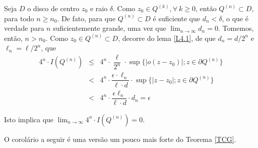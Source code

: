 {Seja $D$ o disco de centro $z_0$ e raio $\delta$. Como $z_0 \in Q^{(k)}, \forall\ k \ge 0$, então $Q^{(n)} \subset D$, para todo $n \ge n_0$. De fato, para que $Q^{(n)} \subset D$ é suficiente que $d_n < \delta$, o que é verdade para $n$ suficientemente grande, uma vez que $\displaystyle\lim_{n \to \infty} d_n = 0$. Tomemos, então, $n > n_0$. Como $z_0 \in Q^{(n)} \subset D$, decorre do lema {\ref{L4.1}}, de que $d_n = d/2^n$ e $\ell_n = \ell/2^n$, que
$$\begin{array}{rcl}
4^n \cdot I(Q^{(n)})
&\le& 4^n \cdot \dfrac{\ell}{2^n} \cdot \sup\{|o(z-z_0)|; z \in \partial Q^{(n)}\} \\
& < & 4^n \cdot \dfrac{\epsilon \cdot \ell_n}{\ell \cdot d} \cdot \sup\{|z-z_0|; z \in \partial Q^{(n)}\} \\
& < & 4^n \cdot \dfrac{\epsilon \ell_n}{\ell \cdot d} \cdot d_n = \epsilon
\end{array}$$

Isto implica que $\displaystyle\lim_{n \to \infty} 4^n \cdot I(Q^{(n)}) = 0$.
}




O corolário a seguir é uma versão um pouco mais forte do Teorema {\ref{TCG}}.


